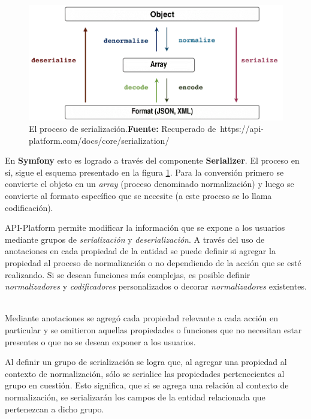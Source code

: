 \begin{figure}[H]
    \includegraphics[width=1\linewidth]{image/serializationWorkflow.png}
    \caption[El proceso de serialización]{El proceso de serialización.\newline \textbf{Fuente:} Recuperado de~https://api-platform.com/docs/core/serialization/}
    \label{fig:image/serializationWorkflow}
\end{figure}

En \textbf{Symfony} esto es logrado a través del componente \textbf{Serializer}. El proceso en sí, sigue el esquema presentado en la figura
\ref{fig:image/serializationWorkflow}\@.
Para la conversión primero se convierte el objeto en un \textit{array} (proceso denominado
normalización) y luego se convierte al formato específico que se necesite (a este proceso se lo llama codificación).

API-Platform permite modificar la información que se expone a los usuarios mediante grupos de \textit{serialización} y \textit{deserialización}\@. A través del uso de anotaciones
en cada propiedad de la entidad se puede definir si agregar la propiedad al proceso de normalización o no dependiendo de la acción que se esté realizando.
Si se desean funciones más complejas, es posible definir \textit{normalizadores} y \textit{codificadores} personalizados o decorar \textit{normalizadores} existentes.
~\parencite{api-platform-serialization}


Mediante anotaciones se agregó cada propiedad relevante a cada acción en particular y se omitieron aquellas propiedades o funciones que no necesitan estar
presentes o que no se desean exponer a los usuarios.

Al definir un grupo de serialización se logra que, al agregar una propiedad al contexto de normalización, sólo se serialice las propiedades pertenecientes
al grupo en cuestión. Esto significa, que si se agrega una relación al contexto de normalización, se serializarán los campos de la entidad relacionada
que pertenezcan a dicho grupo.



